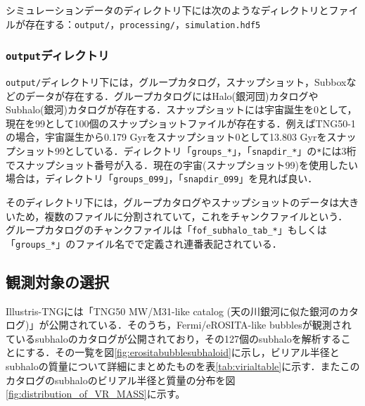 シミュレーションデータのディレクトリ下には次のようなディレクトリとファイルが存在する：\texttt{output/}，\texttt{processing/}，\texttt{simulation.hdf5}

\subsubsection{\texttt{output}ディレクトリ}

\texttt{output/}ディレクトリ下には，グループカタログ，スナップショット，Subboxなどのデータが存在する．グループカタログにはHalo(銀河団)カタログやSubhalo(銀河)カタログが存在する．スナップショットには宇宙誕生を0として，現在を99として100個のスナップショットファイルが存在する．例えばTNG50-1の場合，宇宙誕生から0.179 Gyrをスナップショット0として13.803 Gyrをスナップショット99としている．ディレクトリ「\texttt{groups\_*}」，「\texttt{snapdir\_*}」の\texttt{*}には3桁でスナップショット番号が入る．現在の宇宙(スナップショット99)を使用したい場合は，ディレクトリ「\texttt{groups\_099}」，「\texttt{snapdir\_099}」を見れば良い．

そのディレクトリ下には，グループカタログやスナップショットのデータは大きいため，複数のファイルに分割されていて，これをチャンクファイルという． グループカタログのチャンクファイルは「\texttt{fof\_subhalo\_tab\_*}」もしくは「\texttt{groups\_*}」のファイル名でで定義され連番表記されている．

\subsection{観測対象の選択}

Illustris-TNGには「TNG50 MW/M31-like catalog (天の川銀河に似た銀河のカタログ)」が公開されている\citep{pillepich_milky_2023}．そのうち，Fermi/eROSITA-like bubblesが観測されているsubhaloのカタログが公開されており\citep{pillepich_x-ray_2021}，その127個のsubhaloを解析することにする．その一覧を図\ref{fig:erositabubblesubhaloid}に示し，ビリアル半径とsubhaloの質量について詳細にまとめたものを表\ref{tab:virialtable}に示す．またこのカタログのsubhaloのビリアル半径と質量の分布を図\ref{fig:distribution_of_VR_MASS}に示す。

